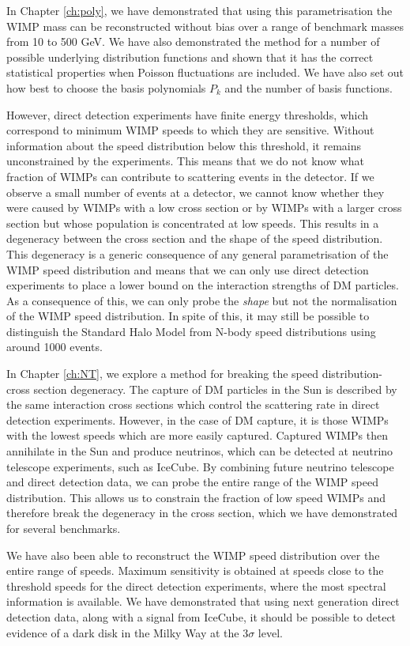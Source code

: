 In Chapter \ref{ch:poly}, we have demonstrated that using this parametrisation the WIMP mass can be reconstructed without bias over a range of benchmark masses from 10 to 500 GeV. We have also demonstrated the method for a number of possible underlying distribution functions and shown that it has the correct statistical properties when Poisson fluctuations are included. We have also set out how best to choose the basis polynomials $P_k$ and the number of basis functions.

However, direct detection experiments have finite energy thresholds, which correspond to minimum WIMP speeds to which they are sensitive. Without information about the speed distribution below this threshold, it remains unconstrained by the experiments. This means that we do not know what fraction of WIMPs can contribute to scattering events in the detector. If we observe a small number of events at a detector, we cannot know whether they were caused by WIMPs with a low cross section or by WIMPs with a larger cross section but whose population is concentrated at low speeds. This results in a degeneracy between the cross section and the shape of the speed distribution. This degeneracy is a generic consequence of any general parametrisation of the WIMP speed distribution and means that we can only use direct detection experiments to place a lower bound on the interaction strengths of DM particles. As a consequence of this, we can only probe the \textit{shape} but not the normalisation of the WIMP speed distribution. In spite of this, it may still be possible to distinguish the Standard Halo Model from N-body speed distributions using around 1000 events.

In Chapter \ref{ch:NT}, we explore a method for breaking the speed distribution-cross section degeneracy. The capture of DM particles in the Sun is described by the same interaction cross sections which control the scattering rate in direct detection experiments. However, in the case of DM capture, it is those WIMPs with the lowest speeds which are more easily captured. Captured WIMPs then annihilate in the Sun and produce neutrinos, which can be detected at neutrino telescope experiments, such as IceCube. By combining future neutrino telescope and direct detection data, we can probe the entire range of the WIMP speed distribution. This allows us to constrain the fraction of low speed WIMPs and therefore break the degeneracy in the cross section, which we have demonstrated for several benchmarks.

We have also been able to reconstruct the WIMP speed distribution over the entire range of speeds. Maximum sensitivity is obtained at speeds close to the threshold speeds for the direct detection experiments, where the most spectral information is available. We have demonstrated that using next generation direct detection data, along with a signal from IceCube, it should be possible to detect evidence of a dark disk in the Milky Way at the $3\sigma$ level.


